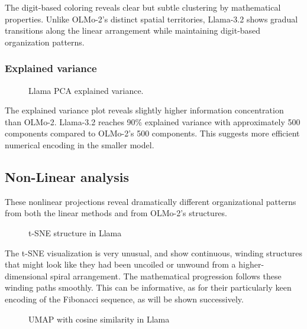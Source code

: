 \documentclass[
  a4paper, twoside, 10pt, titlepage]{book}
\makeatletter
\newcommand*\pandocbounded[1]{%
  \sbox\pandoc@box{#1}%
  \Gscale@div\@tempa{\textheight}{\dimexpr\ht\pandoc@box+\dp\pandoc@box\relax}%
  \Gscale@div\@tempb{\linewidth}{\wd\pandoc@box}%
  \ifdim\@tempb\p@<\@tempa\p@\let\@tempa\@tempb\fi%
  \ifdim\@tempa\p@<\p@\scalebox{\@tempa}{\usebox\pandoc@box}%
  \else\usebox{\pandoc@box}%
  \fi%
}
\makeatother
\begin{document}
The digit-based coloring reveals clear but subtle clustering by
mathematical properties. Unlike OLMo-2's distinct spatial territories,
Llama-3.2 shows gradual transitions along the linear arrangement while
maintaining digit-based organization patterns.

\subsubsection{Explained variance}\label{explained-variance-1}

\begin{figure}
\centering
\pandocbounded{}
\caption{Llama PCA explained variance.}\label{fig-llama-variance}
\end{figure}

The explained variance plot reveals slightly higher information
concentration than OLMo-2. Llama-3.2 reaches 90\% explained variance
with approximately 500 components compared to OLMo-2's 500 components.
This suggests more efficient numerical encoding in the smaller model.

\subsection{Non-Linear analysis}\label{non-linear-analysis-1}

These nonlinear projections reveal dramatically different organizational
patterns from both the linear methods and from OLMo-2's structures.

\begin{figure}
\centering
\pandocbounded{}
\caption{t-SNE structure in Llama}\label{fig-llama-tsne}
\end{figure}

The t-SNE visualization is very unusual, and show continuous, winding
structures that might look like they had been uncoiled or unwound from a
higher-dimensional spiral arrangement. The mathematical progression
follows these winding paths smoothly. This can be informative, as for
their particularly keen encoding of the Fibonacci sequence, as will be
shown successively.

\begin{figure}
\centering
\pandocbounded{}
\caption{UMAP with cosine similarity in
Llama}\label{fig-llama-umap-cosine}
\end{figure}
\end{document}
